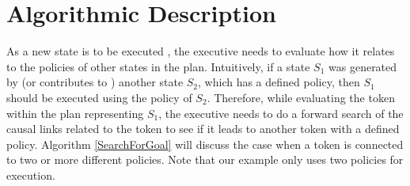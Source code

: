 %
%
%
%
%


\section{Algorithmic Description}
\label{sec:algo}


As a new state is to be executed , the executive needs to evaluate how it relates
to the policies of other states in the plan. Intuitively, if a state
$S_1$ was generated by (or contributes to ) another state $S_2$, which has a defined
policy, then $S_1$ should be executed using the policy of
$S_2$. Therefore, while evaluating the token within the plan
representing $S_1$, the executive needs to do a forward search of the
causal links related to the token to see if it leads to another token
with a defined policy. Algorithm \ref{SearchForGoal} will discuss the
case when a token is connected to two or more different policies. Note
that our example only uses two policies for execution.  %




